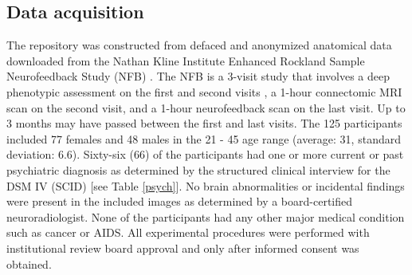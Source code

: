 \documentclass{bmcart}
\begin{document}
\subsection*{Data acquisition}

The repository was constructed from defaced and anonymized anatomical data downloaded from the Nathan Kline Institute Enhanced Rockland Sample Neurofeedback Study (NFB) \cite{Rockland}. The NFB is a 3-visit study that involves a deep phenotypic assessment on the first and second visits \cite{Nooner}, a 1-hour connectomic MRI scan on the second visit, and a 1-hour neurofeedback scan on the last visit. Up to 3 months may have passed between the first and last visits. The 125 participants included 77 females and 48 males in the 21 - 45 age range (average: 31, standard deviation: 6.6). Sixty-six (66) of the participants had one or more current or past psychiatric diagnosis as determined by the structured clinical interview for the DSM IV (SCID) \cite{skid} [see Table \ref{psych}]. No brain abnormalities or incidental findings were present in the included images as determined by a board-certified neuroradiologist. None of the participants had any other major medical condition such as cancer or AIDS. All experimental procedures were performed with institutional review board approval and only after informed consent was obtained.
\end{document}
